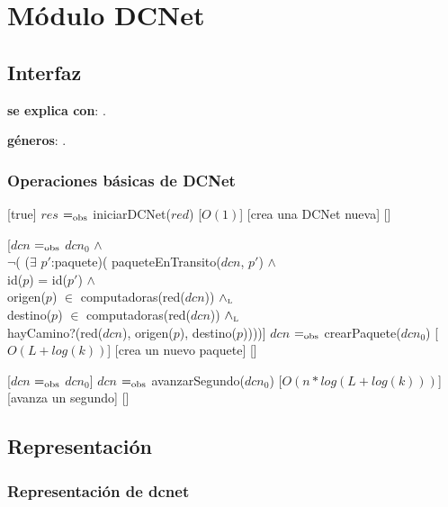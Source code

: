 \section{Módulo DCNet}

\subsection{Interfaz}

\textbf{se explica con}: .

\textbf{géneros}: .

\subsubsection{Operaciones básicas de DCNet}

[true]
{$res$ $=_{\mathrm{obs}}$ iniciarDCNet($red$)}
[$O(1)$]
[crea una DCNet nueva]
[]

[$dcn$ $=_{\mathrm{obs}}$ $dcn_0$ $\land$ \\
$\neg$( ($\exists$ $p'$:paquete)(	paqueteEnTransito($dcn$, $p'$) $\land$ \\
									id($p$) = id($p'$) $\land$ \\
									origen($p$) $\in$ computadoras(red($dcn$)) $\land_{\mathrm{\scriptscriptstyle{L}}}$ \\
									destino($p$) $\in$ computadoras(red($dcn$)) $\land_{\mathrm{\scriptscriptstyle{L}}}$ \\
									hayCamino?(red($dcn$), origen($p$), destino($p$))))]
{$dcn$ $=_{\mathrm{obs}}$ crearPaquete($dcn_0$)}
[$O(L + log(k))$]
[crea un nuevo paquete]
[]

[$dcn$ $=_{\mathrm{obs}}$ $dcn_0$]
{$dcn$ $=_{\mathrm{obs}}$ avanzarSegundo($dcn_0$)}
[$O(n * log(L + log(k)))$]
[avanza un segundo]
[]

\subsection{Representación}

\subsubsection{Representación de dcnet}

